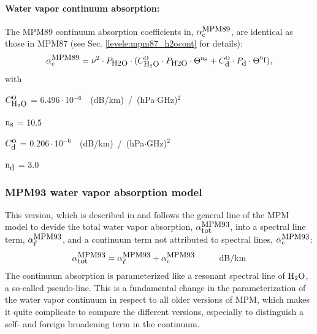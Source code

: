 \paragraph{Water vapor continuum absorption:}
\label{levele:mpm89_h2ocont}
The MPM89 continuum absorption coefficients in, $\alpha^{\mbox{\rm \small MPM89}}_{\rm c}$, 
are identical as those in MPM87 (see Sec. \ref{levele:mpm87_h2ocont} for 
details):
\begin{equation} 
  \label{eq:abs_theory:mpm89:cont}
  \alpha^{\mbox{\rm \small MPM89}}_{\rm c} = \nu^2 \cdot P_{\mbox{\rm \small H2O}} \cdot 
                (C^{\mbox{\rm o}}_{\mbox{\rm \small H}_{2}\mbox{\rm \small O}} \cdot P_{\mbox{\rm \small H2O}} \cdot \Theta^{{\rm n}_{\mbox{\rm \small s}}} + 
                 C^{\mbox{\rm o}}_{\mbox{\rm \small d}} \cdot P_{\mbox{\rm \small d}}  \cdot \Theta^{{\rm n}_{\mbox{\rm \small f}}}),
\end{equation}
with
\begin{description}
\item{$C^{\mbox{\rm o}}_{\mbox{\rm \small H}_{2}\mbox{\rm \small O}}$}   =  6.496\,$\cdot$\,10$^{-6}$~~(dB/km)~/~(hPa$\cdot$GHz)$^2$
\item{${\rm n}_{\mbox{\rm \small s}}$}    = 10.5
\item{$C^{\mbox{\rm o}}_{\mbox{\rm \small d}}$}   =  0.206\,$\cdot$\,10$^{-6}$~~(dB/km)~/~(hPa$\cdot$GHz)$^2$
\item{${\rm n}_{\mbox{\rm \small d}}$}    =  3.0
\end{description}





\subsubsection{MPM93 water vapor absorption model}
\label{leveld:mpm93}
This version, which is described in \citet{liebeetal:93} and 
follows the general line of the MPM model to devide the total 
water vapor absorption, $\alpha^{\mbox{\rm \small MPM93}}_{\mbox{\small tot}}$, into a spectral line 
term, $\alpha^{\mbox{\rm \small MPM93}}_{\mbox{\small $\ell$}}$, and a continuum term not attributed to 
spectral lines, $\alpha^{\mbox{\rm \small MPM93}}_{\rm c}$:
\begin{equation}
  \label{eq:abs_theory:mpm93_abs}
  \alphampmntot = \alphampmnl + \alphampmnc\hspace*{10mm}\mbox{dB/km}
\end{equation}
The continuum absorption is parameterized like a
resonant spectral line of $\mbox{H}_2\mbox{O}$, a so-called pseudo-line. This is a 
fundamental change in the parameterization of the water vapor
continuum in respect to all older versions of MPM, which makes it 
quite complicate to compare the different versions, especially to 
distinguish a self- and foreign broadening term in the continuum.



